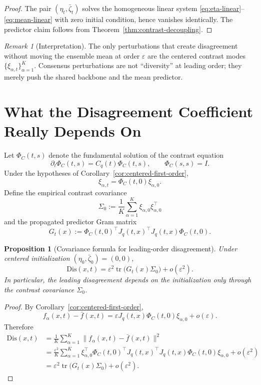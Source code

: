\documentclass[11pt]{article}
\newcommand{\tr}{\operatorname{tr}}
\newtheorem{proposition}[theorem]{Proposition}
\theoremstyle{remark}
\newtheorem{remark}[theorem]{Remark}
\begin{document}
\begin{proof}
The pair $(\eta_t,\bar\zeta_t)$ solves the homogeneous linear system \eqref{eq:eta-linear}--\eqref{eq:mean-linear} with zero initial condition, hence vanishes identically. The predictor claim follows from Theorem~\ref{thm:contrast-decoupling}.
\end{proof}

\begin{remark}[Interpretation]
The only perturbations that create disagreement without moving the ensemble mean at order $\varepsilon$ are the centered contrast modes $\{\xi_{\alpha,t}\}_{\alpha=1}^K$. Consensus perturbations are not ``diversity'' at leading order; they merely push the shared backbone and the mean predictor.
\end{remark}

\section{What the Disagreement Coefficient Really Depends On}

Let $\Phi_C(t,s)$ denote the fundamental solution of the contrast equation
\[
\partial_t \Phi_C(t,s) = C_q(t)\Phi_C(t,s),
\qquad
\Phi_C(s,s)=I.
\]
Under the hypotheses of Corollary~\ref{cor:centered-first-order},
\[
\xi_{\alpha,t} = \Phi_C(t,0)\xi_{\alpha,0}.
\]
Define the empirical contrast covariance
\[
\Sigma_0 := \frac1K \sum_{\alpha=1}^K \xi_{\alpha,0}\xi_{\alpha,0}^\top
\]
and the propagated predictor Gram matrix
\begin{equation}
G_t(x)
:=
\Phi_C(t,0)^\top J_q(t,x)^\top J_q(t,x)\Phi_C(t,0).
\label{eq:gram}
\end{equation}

\begin{proposition}[Covariance formula for leading-order disagreement]
\label{prop:covariance-formula}
Under centered initialization $(\eta_0,\bar\zeta_0)=(0,0)$,
\begin{equation}
\mathrm{Dis}(x,t)
=
\varepsilon^2 \tr\!\bigl(G_t(x)\Sigma_0\bigr) + o(\varepsilon^2).
\label{eq:dis-covariance}
\end{equation}
In particular, the leading disagreement depends on the initialization only through the contrast covariance $\Sigma_0$.
\end{proposition}

\begin{proof}
By Corollary~\ref{cor:centered-first-order},
\[
f_\alpha(x,t)-\bar f(x,t)
=
\varepsilon J_q(t,x)\Phi_C(t,0)\xi_{\alpha,0} + o(\varepsilon).
\]
Therefore
\begin{align*}
\mathrm{Dis}(x,t)
&=
\frac1K \sum_{\alpha=1}^K \|f_\alpha(x,t)-\bar f(x,t)\|^2\\
&=
\frac{\varepsilon^2}{K}
\sum_{\alpha=1}^K
\xi_{\alpha,0}^\top
\Phi_C(t,0)^\top J_q(t,x)^\top J_q(t,x)\Phi_C(t,0)
\xi_{\alpha,0}
 + o(\varepsilon^2)\\
&=
\varepsilon^2 \tr\!\bigl(G_t(x)\Sigma_0\bigr) + o(\varepsilon^2).
\end{align*}
\end{proof}
\end{document}
